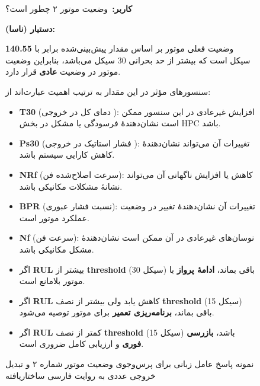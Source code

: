 \begin{figure}[h]
	\centering
	\begin{minipage}{0.95\textwidth}
		
		\begin{userBox}
			\textbf{کاربر:}\ وضعیت موتور ۲ چطور است؟
		\end{userBox}
		
		\begin{botBox}
			\textbf{دستیار (ناسا):}
			
			\medskip
			وضعیت فعلی موتور بر اساس مقدار پیش‌بینی‌شده
			برابر با \textbf{140.55} سیکل است که
			بیشتر از حد بحرانی 30 سیکل می‌باشد، بنابراین وضعیت موتور در وضعیت \textbf{عادی}
			قرار دارد.
			
			\medskip
			سنسورهای مؤثر در این مقدار
			به ترتیب اهمیت عبارت‌اند از:
			
			\begin{itemize}[rightmargin=1.5em, topsep=3pt, itemsep=4pt]
				\item \textbf{T30} (دمای کل در خروجی ): افزایش غیرعادی در این سنسور ممکن است
				نشان‌دهندهٔ فرسودگی یا مشکل در بخش HPC باشد.
				\item \textbf{Ps30} (فشار استاتیک در خروجی ): تغییرات آن می‌تواند نشان‌دهندهٔ
				کاهش کارایی سیستم باشد.
				\item \textbf{NRf} (سرعت اصلاح‌شده فن): کاهش یا افزایش ناگهانی آن می‌تواند نشانهٔ
				مشکلات مکانیکی باشد.
				\item \textbf{BPR} (نسبت فشار عبوری): تغییرات آن نشان‌دهندهٔ تغییر در وضعیت
				عملکرد موتور است.
				\item \textbf{Nf} (سرعت فن): نوسان‌های غیرعادی در آن ممکن است نشان‌دهندهٔ مشکل
				مکانیکی باشد.
			\end{itemize}
			
			\medskip
			
			\begin{itemize}[rightmargin=1.5em, topsep=3pt, itemsep=4pt]
				\item اگر \textbf{RUL} بیشتر از \textbf{threshold} (سیکل 30) باقی بماند،
				\textbf{ادامهٔ پرواز} با موتور بلامانع است.
				\item اگر \textbf{RUL} کاهش یابد ولی بیشتر از نصف \textbf{threshold} (سیکل 15)
				باقی بماند، \textbf{برنامه‌ریزی تعمیر} برای موتور توصیه می‌شود.
				\item اگر \textbf{RUL} کمتر از نصف \textbf{threshold} (سیکل 15) باشد،
				\textbf{بازرسی فوری} و ارزیابی کامل ضروری است.
			\end{itemize}
			
		\end{botBox}
		
	\end{minipage}
	\caption{
		نمونه پاسخ عامل زبانی برای پرس‌وجوی وضعیت موتور شماره ۲ و تبدیل خروجی عددی به روایت فارسی ساختاریافته
		}
	\label{qa:llm-engine-query-2}
\end{figure}




